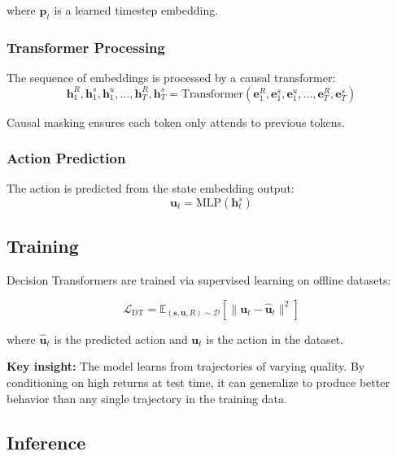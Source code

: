 where $\mathbf{p}_t$ is a learned timestep embedding.

\subsubsection{Transformer Processing}

The sequence of embeddings is processed by a causal transformer:
\begin{equation}
\mathbf{h}_1^R, \mathbf{h}_1^s, \mathbf{h}_1^u, \ldots, \mathbf{h}_T^R, \mathbf{h}_T^s = \text{Transformer}(\mathbf{e}_1^R, \mathbf{e}_1^s, \mathbf{e}_1^u, \ldots, \mathbf{e}_T^R, \mathbf{e}_T^s)
\end{equation}

Causal masking ensures each token only attends to previous tokens.

\subsubsection{Action Prediction}

The action is predicted from the state embedding output:
\begin{equation}
\mathbf{u}_t = \text{MLP}(\mathbf{h}_t^s)
\end{equation}

\subsection{Training}

Decision Transformers are trained via supervised learning on offline datasets:

\begin{equation}
\mathcal{L}_{\text{DT}} = \mathbb{E}_{(\mathbf{s}, \mathbf{u}, R) \sim \mathcal{D}} \left[ \| \mathbf{u}_t - \hat{\mathbf{u}}_t \|^2 \right]
\end{equation}

where $\hat{\mathbf{u}}_t$ is the predicted action and $\mathbf{u}_t$ is the action in the dataset.

\textbf{Key insight:} The model learns from trajectories of varying quality. By conditioning on high returns at test time, it can generalize to produce better behavior than any single trajectory in the training data.

\subsection{Inference}

